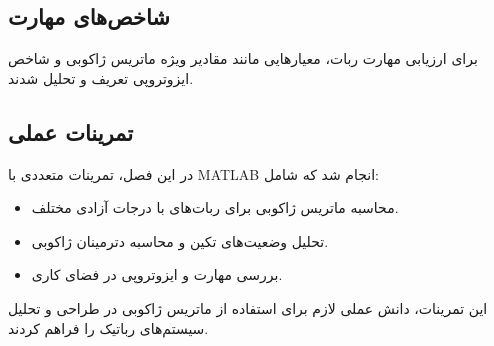 \subsection*{شاخص‌های مهارت}
برای ارزیابی مهارت ربات، معیارهایی مانند مقادیر ویژه ماتریس ژاکوبی و شاخص ایزوتروپی تعریف و تحلیل شدند.

\subsection*{تمرینات عملی}
در این فصل، تمرینات متعددی با MATLAB انجام شد که شامل:
\begin{itemize}
	\item محاسبه ماتریس ژاکوبی برای ربات‌های با درجات آزادی مختلف.
	\item تحلیل وضعیت‌های تکین و محاسبه دترمینان ژاکوبی.
	\item بررسی مهارت و ایزوتروپی در فضای کاری.
\end{itemize}
این تمرینات، دانش عملی لازم برای استفاده از ماتریس ژاکوبی در طراحی و تحلیل سیستم‌های رباتیک را فراهم کردند.



